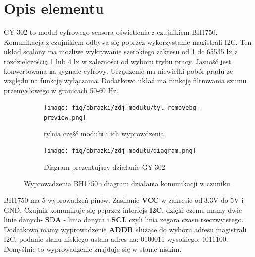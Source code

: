 \documentclass[11pt, a4paper]{article}
\author{Hubert Pietrzak}
\institute{Instytut Robotyki i Inteligencji Maszynowej}
\begin{document}
\newpage

\section*{Opis elementu} 

GY-302 to moduł cyfrowego sensora oświetlenia z czujnikiem BH1750. Komunikacja z czujnikiem odbywa się poprzez wykorzystanie magistrali I2C. Ten układ scalony ma możliwe wykrywanie szerokiego zakresu  od 1 do 65535 lx z rozdzielczością 1 lub 4 lx w zależności od wyboru trybu pracy. Jasność jest konwertowana na sygnałc cyfrowy. Urządzenie ma niewielki pobór prądu ze względu na funkcję wyłączania. Dodatkowo układ ma funkcję filtrowania szumu przemysłowego w granicach 50-60 Hz. 


\vspace{0.5cm}
\begin{figure}[h]
\centering
\begin{subfigure}{.5\textwidth}
  \centering
  \texttt{[image: fig/obrazki/zdj\_modułu/tyl-removebg-preview.png]}
  \caption{tylnia część modułu i ich wyprowdzenia}
  \label{fig:sub1}
\end{subfigure}%
\begin{subfigure}{.5\textwidth}
  \centering
  \texttt{[image: fig/obrazki/zdj\_modułu/diagram.png]}
  \caption{Diagram prezentujący działanie GY-302}
  \label{fig:sub2}
\end{subfigure}
\caption{Wyprowadzenia BH1750 i diagram działania komunikacji w czuniku}
\label{fig:test}
\end{figure}
\vspace{0.5cm}



BH1750 ma 5 wyprowadzeń pinów. Zasilanie \textbf{VCC} w zakresie od 3.3V do 5V i GND. Czujnik komunikuje się poprzez interfejs \textbf{I2C}, dzięki czemu mamy dwie linie danych- \textbf{SDA} - linia danych i \textbf{SCL} czyli linia zegara czasu rzeczwyistego.
Dodatkowo mamy wyprowadzenie \textbf{ADDR} służące do wyboru adresu magistrali I2C, podanie stanu niskiego ustala adres na: 0100011  wysokiego: 1011100. Domyślnie to wyprowadzenie znajduje się w stanie niskim.
\end{document}

